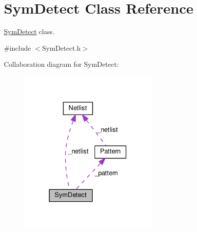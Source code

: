 \hypertarget{classSymDetect}{}\section{Sym\+Detect Class Reference}
\label{classSymDetect}


\hyperlink{classSymDetect}{Sym\+Detect} class.  




{\ttfamily \#include $<$Sym\+Detect.\+h$>$}



Collaboration diagram for Sym\+Detect\+:\nopagebreak
\begin{figure}[H]
\begin{center}
\leavevmode
\includegraphics[width=198pt]{classSymDetect__coll__graph}
\end{center}
\end{figure}
